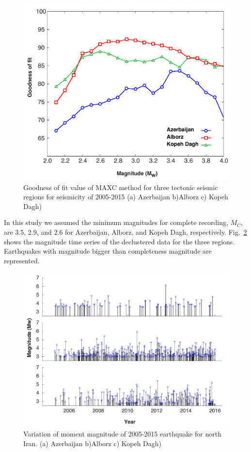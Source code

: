 \begin{figure} [ht]
\centering
\includegraphics[scale=0.4]{figures/pdf/Figure03.pdf} 
\caption{Goodness of fit value of MAXC method for three tectonic seismic regions for seismicity of 2005-2015 (a) Azerbaijan b)Alborz c) Kopeh Dagh)}
\label{fig:completeness}
\end{figure} 





\noindent
In this study we assumed the minimum magnitudes for complete recording, $M_C$, are 3.5, 2.9, and 2.6 for Azerbaijan, Alborz, and Kopeh Dagh, respectively. Fig.~\ref{fig:mag-time} shows the magnitude time series of the declustered data for the three regions. Earthquakes with magnitude bigger than completeness magnitude are represented. 

\begin{figure} [ht]
\centering
\includegraphics[scale=0.5]{figures/pdf/Figure04.pdf} 
\caption{Variation of moment magnitude of 2005-2015 earthquake for north Iran. (a) Azerbaijan b)Alborz c) Kopeh Dagh)}
\label{fig:mag-time}
\end{figure} 








